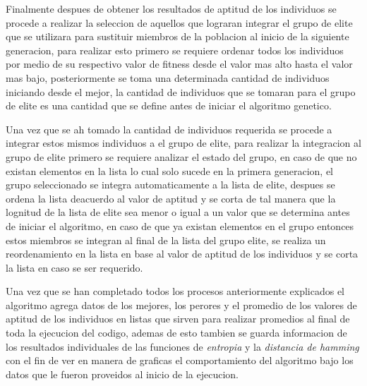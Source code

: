 Finalmente despues de obtener los resultados de aptitud de los individuos se
procede a realizar la seleccion de aquellos que lograran integrar el grupo de
elite que se utilizara para sustituir miembros de la poblacion al inicio de la
siguiente generacion, para realizar esto primero se requiere ordenar todos los
individuos por medio de su respectivo valor de fitness desde el valor mas alto
hasta el valor mas bajo, posteriormente se toma una determinada cantidad de
individuos iniciando desde el mejor, la cantidad de individuos que se tomaran
para el grupo de elite es una cantidad que se define antes de iniciar el
algoritmo genetico.

Una vez que se ah tomado la cantidad de individuos requerida se procede a
integrar estos mismos individuos a el grupo de elite, para realizar la
integracion al grupo de elite primero se requiere analizar el estado del grupo,
en caso de que no existan elementos en la lista lo cual solo sucede en la
primera generacion, el grupo seleccionado se integra automaticamente a la lista
de elite, despues se ordena la lista deacuerdo al valor de aptitud y se corta de
tal manera que la lognitud de la lista de elite sea menor o igual a un valor que
se determina antes de iniciar el algoritmo, en caso de que ya existan elementos
en el grupo entonces estos miembros se integran al final de la lista del grupo
elite, se realiza un reordenamiento en la lista en base al valor de aptitud de
los individuos y se corta la lista en caso se ser requerido.

Una vez que se han completado todos los procesos anteriormente explicados el
algoritmo agrega datos de los mejores, los perores y el promedio de los valores
de aptitud de los individuos en listas que sirven para realizar promedios al
final de toda la ejecucion del codigo, ademas de esto tambien se guarda
informacion de los resultados individuales de las funciones de \textit{entropia}
y la \textit{distancia de hamming} con el fin de ver en manera de graficas el
comportamiento del algoritmo bajo los datos que le fueron proveidos al inicio de
la ejecucion.